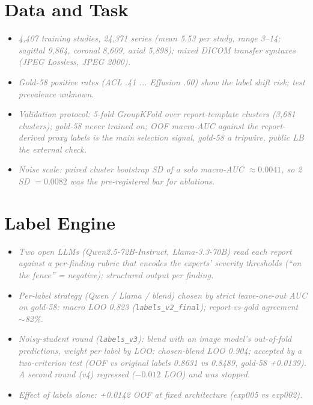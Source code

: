\documentclass[conference]{IEEEtran}
\newcommand{\nt}[1]{\textcolor{gray}{\textit{#1}}}            %
\begin{document}
\section{Data and Task}
\begin{notes}
\begin{itemize}
\item \nt{4,407 training studies, 24,371 series (mean 5.53 per study, range 3--14; sagittal 9,864, coronal 8,609,
axial 5,898); mixed DICOM transfer syntaxes (JPEG Lossless, JPEG 2000).}  %
\item \nt{Gold-58 positive rates (ACL .41 ... Effusion .60) show the label shift risk; test prevalence unknown.}
\item \nt{Validation protocol: 5-fold GroupKFold over report-template clusters (3,681 clusters); gold-58 never trained
on; OOF macro-AUC against the report-derived proxy labels is the main selection signal, gold-58 a tripwire, public LB the
external check.}  %
\item \nt{Noise scale: paired cluster bootstrap SD of a solo macro-AUC $\approx 0.0041$, so 2 SD $=0.0082$ was the
pre-registered bar for ablations.}  %
\end{itemize}
\end{notes}

\section{Label Engine}
\begin{notes}
\begin{itemize}
\item \nt{Two open LLMs (Qwen2.5-72B-Instruct, Llama-3.3-70B) read each report against a per-finding rubric that encodes
the experts' severity thresholds (``on the fence'' = negative); structured output per finding.}
\item \nt{Per-label strategy (Qwen / Llama / blend) chosen by strict leave-one-out AUC on gold-58: macro LOO 0.823
(\texttt{labels\_v2\_final}); report-vs-gold agreement $\sim$82\%.}  %
\item \nt{Noisy-student round (\texttt{labels\_v3}): blend with an image model's out-of-fold predictions, weight per label
by LOO: chosen-blend LOO 0.904; accepted by a two-criterion test (OOF vs original labels 0.8631 vs 0.8489, gold-58
+0.0139). A second round (v4) regressed ($-0.012$ LOO) and was stopped.}  %
\item \nt{Effect of labels alone: +0.0142 OOF at fixed architecture (exp005 vs exp002).}  %
\end{itemize}
\end{notes}
\end{document}

